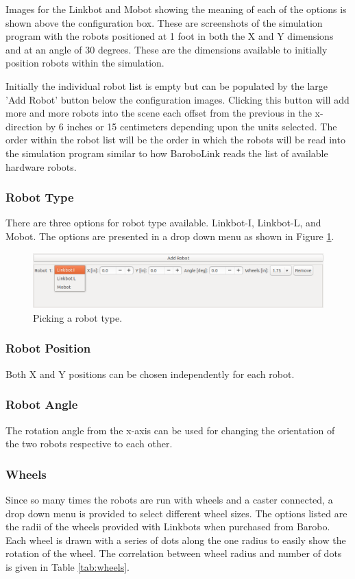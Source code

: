 \documentclass{article}
\begin{document}
Images for the Linkbot and Mobot showing the meaning of each of the options is
shown above the configuration box.  These are screenshots of the simulation
program with the robots positioned at 1 foot in both the X and Y dimensions and
at an angle of 30 degrees.  These are the dimensions available to initially position
robots within the simulation.

Initially the individual robot list is empty but can be populated by the large
'Add Robot' button below the configuration images.  Clicking this button will
add more and more robots into the scene each offset from the previous in the
x-direction by 6 inches or 15 centimeters depending upon the units selected.
The order within the robot list will be the order in which the robots will be
read into the simulation program similar to how BaroboLink reads the list of
available hardware robots.

\subsubsection{Robot Type}
There are three options for robot type available.  Linkbot-I, Linkbot-L,
and Mobot.  The options are presented in a drop down menu as shown in
Figure \ref{fig:type}.
\begin{figure}[H]
	\begin{center}
		\includegraphics[width=6in]{images/type}
	\end{center}
	\caption{Picking a robot type.}
	\label{fig:type}
\end{figure}

\subsubsection{Robot Position}
Both X and Y positions can be chosen independently for each robot.

\subsubsection{Robot Angle}
The rotation angle from the x-axis can be used for changing the orientation of
the two robots respective to each other. 

\subsubsection{Wheels}
Since so many times the robots are run with wheels and a caster connected, a
drop down menu is provided to select different wheel sizes.  The options listed
are the radii of the wheels provided with Linkbots when purchased from Barobo.
Each wheel is drawn with a series of dots along the one radius to easily show
the rotation of the wheel.  The correlation between wheel radius and number of
dots is given in Table \ref{tab:wheels}.
\end{document}
